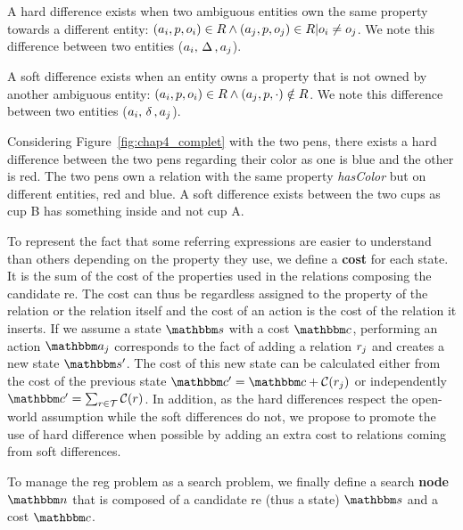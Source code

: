 \begin{definition}
A hard difference exists when two ambiguous entities own the same property towards a different entity: $(a_i, p, o_i) \in R \land (a_j, p, o_j) \in R | o_i \neq o_j$. We note this difference between two entities ($a_i, \,\Delta\,, a_j$).
\end{definition}

\begin{definition}
A soft difference exists when an entity owns a property that is not owned by another ambiguous entity: $(a_i, p, o_i) \in R \land (a_j, p, \cdot) \notin R$. We note this difference between two entities ($a_i, \,\delta\,, a_j$).
\end{definition}

Considering Figure~\ref{fig:chap4_complet} with the two pens, there exists a hard difference between the two pens regarding their color as one is blue and the other is red. The two pens own a relation with the same property \textit{hasColor} but on different entities, red and blue. A soft difference exists between the two cups as cup B has something inside and not cup A.

To represent the fact that some referring expressions are easier to understand than others depending on the property they use, we define a \textbf{cost} for each state. It is the sum of the cost of the properties used in the relations composing the candidate \acrshort{re}. The cost can thus be regardless assigned to the property of the relation or the relation itself and the cost of an action is the cost of the relation it inserts. If we assume a state $\state$ with a cost $\cost$, performing an action $\action_j$ corresponds to the fact of adding a relation $r_j$ and creates a new state $\state'$. The cost of this new state can be calculated either from the cost of the previous state $\cost' = \cost + \costfunc(\relation_j)$ or independently $\cost' = \sum_{\relation \in \mathcal{T}} \costfunc(\relation)$. In addition, as the hard differences respect the open-world assumption while the soft differences do not, we propose to promote the use of hard difference when possible by adding an extra cost to relations coming from soft differences.

To manage the \acrshort{reg} problem as a search problem, we finally define a search \textbf{node} $\node$ that is composed of a candidate \acrshort{re} (thus a state) $\state$ and a cost $\cost$.

